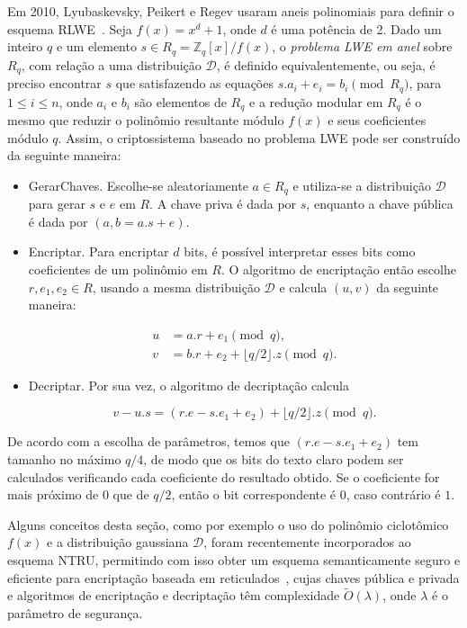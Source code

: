 \documentclass{SBCbookchapter}
\begin{document}
\begin{otherlanguage}{brazilian}
Em 2010, Lyubaskevsky, Peikert e Regev usaram aneis polinomiais para definir o esquema RLWE~\cite{RingLWE}. Seja $f(x) = x^d + 1$, onde $d$ é uma potência de 2. Dado um inteiro $q$ e um elemento $s \in R_q = \mathbb{Z}_q[x]/f(x)$, o \textit{problema LWE em anel} sobre $R_q$, com relação a uma distribuição $\mathcal{D}$, é definido equivalentemente, ou seja, é preciso encontrar $s$ que satisfazendo as equações $s.a_i + e_i = b_i \pmod{R_q}$, para $1 \leq i \leq n$, onde $a_i$ e $b_i$ são elementos de $R_q$ e a redução modular em $R_q$ é o mesmo que reduzir o polinômio resultante módulo $f(x)$ e seus coeficientes módulo $q$. Assim, o criptossistema baseado no problema LWE pode ser construído da seguinte maneira:

\begin{itemize}
\item \textsf{GerarChaves.} Escolhe-se aleatoriamente $a \in R_q$ e utiliza-se a distribuição $\mathcal{D}$ para gerar $s$ e $e$ em $R$. 
A chave priva é dada por $s$, enquanto a chave pública é dada por $(a, b= a.s + e)$. 
\item \textsf{Encriptar.} Para encriptar $d$ bits, é possível interpretar esses bits como coeficientes de um polinômio em $R$. O algoritmo de encriptação então escolhe $r,e_1,e_2 \in R$, usando a mesma distribuição $\mathcal{D}$ e calcula $(u,v)$ da seguinte maneira:

\begin{align*}
u &= a.r + e_1 \pmod q \textrm{,}\\
v &= b.r + e_2 + \lfloor q/2 \rfloor .z \pmod q.
\end{align*}

\item \textsf{Decriptar.} Por sua vez, o algoritmo de decriptação calcula

\[
v - u.s = (r.e - s.e_1 + e_2) + \lfloor q/2 \rfloor .z \pmod q.
\]

\end{itemize}

De acordo com a escolha de parâmetros, temos que $(r.e - s.e_1 + e_2)$ tem tamanho no máximo $q/4$, de modo que os bits do texto claro podem ser calculados verificando cada coeficiente do resultado obtido. Se o coeficiente for mais próximo de $0$ que de $q/2$, então o bit correspondente é $0$, caso contrário é $1$. 

Alguns conceitos desta seção, como por exemplo o uso do polinômio ciclotômico $f(x)$ e a distribuição gaussiana $\mathcal{D}$, foram recentemente incorporados ao esquema NTRU, permitindo com isso obter um esquema semanticamente seguro e eficiente para encriptação baseada em reticulados~\cite{Stehle2011}, cujas chaves pública e privada e algoritmos de encriptação e decriptação têm complexidade $\tilde{O}(\lambda)$, onde $\lambda$ é o parâmetro de segurança.


\end{otherlanguage}
\end{document}
